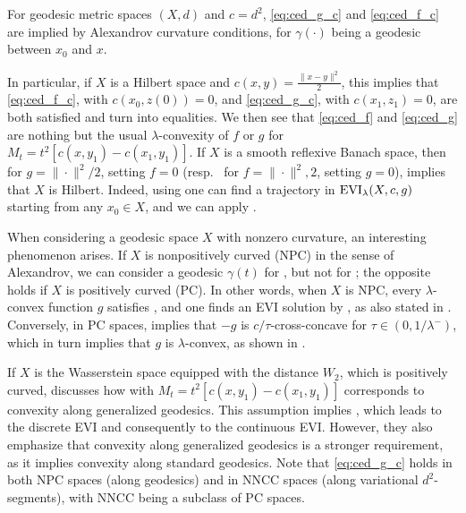 \documentclass[reqno]{amsart}
\theoremstyle{plain}
\theoremstyle{remark}
\theoremstyle{plain}
\numberwithin{equation}{section}
\theoremstyle{remark}
\newenvironment{continuance}[1]
  {\newcommand\continuanceref{\ref{#1}}\continuancex}
  {\endcontinuancex}
\DeclareMathOperator{\EVI}{{\rm EVI}}
\begin{document}
\begin{continuance}{ex:distance} For geodesic metric spaces $(X,d)$ and $c=d^2$, \eqref{eq:ced_g_c} and \eqref{eq:ced_f_c} are implied by Alexandrov curvature conditions, for $\gamma(\cdot)$  being  a geodesic between $x_0$ and $x$.

 In particular, if $X$ is a Hilbert space and $c(x,y)=\frac{\|x-y\|^2}{2}$, this  implies that  \eqref{eq:ced_f_c}, with $c(x_0,z(0))=0$, and \eqref{eq:ced_g_c}, with $c(x_1,z_1)=0$,  are both  satisfied and  turn   into equalities. We then see that \eqref{eq:ced_f} and \eqref{eq:ced_g} are nothing  but  the usual $\lambda$-convexity of $f$ or $g$ for  $M_t=t^2[c(x,y_1)- c(x_1,y_1)]$. If $X$ is  a smooth reflexive Banach space, then   for $g={\|\cdot\|^2}/{2}$, setting $f=0$ (resp.\  for $f={\|\cdot\|^2},{2}$, setting $g=0$), implies that $X$ is Hilbert. Indeed, using   one can find a trajectory in  $\EVI_\lambda(X,c, g)$ starting from any $x_0\in X$,  and we  can apply \cite[Corollary 4.5]{vonRenesse2012}.

  When considering a geodesic space $X$ with nonzero curvature, an interesting phenomenon arises. If $X$ is nonpositively curved (NPC) in the sense of Alexandrov, we can consider a geodesic $\gamma(t)$ for , but not for ; the opposite holds if $X$ is positively curved (PC). In other words, when $X$ is NPC, every $\lambda$-convex function $g$ satisfies , and one finds an EVI solution by , as also stated in \cite[Theorem 3.14]{MuratoriSavare}. Conversely, in PC spaces,  implies that $-g$ is $c/\tau$-cross-concave for $\tau \in (0, 1/\lambda^-)$, which in turn implies that $g$ is $\lambda$-convex, as shown in \cite[Proposition 4.14]{leger2023gradient}.

If $X$ is the Wasserstein space equipped with the distance $W_2$, which is positively curved, \cite[Remark 9.2.8]{ags08} discusses how  with $M_t = t^2[c(x,y_1)- c(x_1,y_1)]$ corresponds to convexity along generalized geodesics. This assumption implies \cite[Assumption 4.0.1]{ags08}, which leads to the discrete EVI and consequently to the continuous EVI. However, they also emphasize that convexity along generalized geodesics is a stronger requirement, as it implies convexity along standard geodesics.
Note that \eqref{eq:ced_g_c} holds in both NPC spaces (along geodesics) and in NNCC spaces (along variational $d^2$-segments), with NNCC being a subclass of PC spaces.


\end{continuance}
\end{document}
